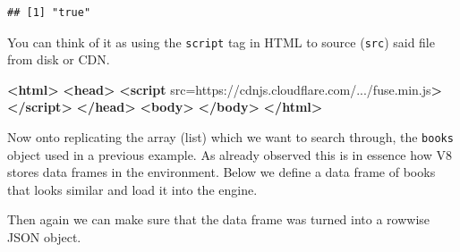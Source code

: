 \documentclass[
]{krantz}
\makeatletter
\newenvironment{Shaded}{\begin{snugshade}}{\end{snugshade}}
\newcommand{\DataTypeTok}[1]{\textcolor[rgb]{0.27,0.27,0.27}{#1}}
\newcommand{\KeywordTok}[1]{\textcolor[rgb]{0.27,0.27,0.27}{\textbf{#1}}}
\newcommand{\NormalTok}[1]{#1}
\newcommand{\OperatorTok}[1]{\textcolor[rgb]{0.43,0.43,0.43}{\textbf{#1}}}
\newcommand{\OtherTok}[1]{\textcolor[rgb]{0.37,0.37,0.37}{#1}}
\newcommand{\StringTok}[1]{\textcolor[rgb]{0.5,0.5,0.5}{#1}}
\newenvironment{kframe}{%
\medskip{}
\setlength{\fboxsep}{.8em}
 \def\at@end@of@kframe{}%
 \ifinner\ifhmode%
  \def\at@end@of@kframe{\end{minipage}}%
  \begin{minipage}{\columnwidth}%
 \fi\fi%
 \def\FrameCommand##1{\hskip\@totalleftmargin \hskip-\fboxsep
 \colorbox{shadecolor}{##1}\hskip-\fboxsep
     \hskip-\linewidth \hskip-\@totalleftmargin \hskip\columnwidth}%
 \MakeFramed {\advance\hsize-\width
   \@totalleftmargin\z@ \linewidth\hsize
   \@setminipage}}%
 {\par\unskip\endMakeFramed%
 \at@end@of@kframe}
\renewenvironment{Shaded}{\begin{kframe}}{\end{kframe}}
\makeatother
\begin{document}
\begin{verbatim}
## [1] "true"
\end{verbatim}

You can think of it as using the \texttt{script} tag in HTML to source (\texttt{src}) said file from disk or CDN.

\begin{Shaded}
\begin{Highlighting}[]
\KeywordTok{<html>}
  \KeywordTok{<head>}
    \KeywordTok{<script}\OtherTok{ src=}\StringTok{\textquotesingle{}https://cdnjs.cloudflare.com/.../fuse.min.js\textquotesingle{}}\KeywordTok{></script>}
  \KeywordTok{</head>}
  \KeywordTok{<body>}
  \KeywordTok{</body>}
\KeywordTok{</html>}
\end{Highlighting}
\end{Shaded}

Now onto replicating the array (list) which we want to search through, the \texttt{books} object used in a previous example. As already observed this is in essence how V8 stores data frames in the environment. Below we define a data frame of books that looks similar and load it into the engine.

\begin{Shaded}
\end{Shaded}

Then again we can make sure that the data frame was turned into a rowwise JSON object.

\begin{Shaded}
\end{Shaded}
\end{document}
